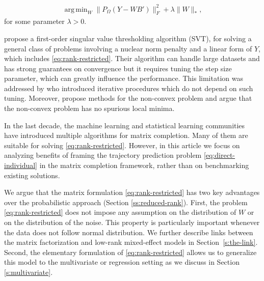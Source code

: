 \documentclass[preprint]{imsart}
\numberwithin{equation}{section}
\theoremstyle{plain}
\DeclareMathOperator*{\argmin}{arg\,min}
\DeclareMathOperator*{\rank}{rank}
\begin{document}

\begin{align}
  \argmin_W \| P_\Omega(Y - WB') \|_F^2 + \lambda\|W\|_*,
\label{eq:rank-restricted}
\end{align}
for some parameter $\lambda > 0$.

\citet{cai2010singular} propose a first-order singular value thresholding algorithm (SVT), for solving a general class of problems involving a nuclear norm penalty and a linear form of $Y$, which includes \eqref{eq:rank-restricted}. Their algorithm can handle large datasets and has strong guarantees on convergence but it requires tuning the step size parameter, which can greatly influence the performance. This limitation was addressed by \citet{ma2011fixed,mazumder2010spectral,hastie2015matrix} who introduced iterative procedures which do not depend on such tuning. Moreover, \citet{hardt2014fast,chen2015fast} propose methods for the non-convex problem and \citet{ge2016matrix} argue that the non-convex problem has no spurious local minima.

In the last decade, the machine learning and statistical learning communities have introduced multiple algorithms for matrix completion. Many of them are suitable for solving \eqref{eq:rank-restricted}. However, in this article we focus on analyzing benefits of framing the trajectory prediction problem \eqref{eq:direct-individual} in the matrix completion framework, rather than on benchmarking existing solutions.

We argue that the matrix formulation \eqref{eq:rank-restricted} has two key advantages over the probabilistic approach (Section \ref{ss:reduced-rank}). First, the problem \eqref{eq:rank-restricted} does not impose any assumption on the distribution of $W$ or on the distribution of the noise. This property is particularly important whenever the data does not follow normal distribution. We further describe links between the matrix factorization and low-rank mixed-effect models in Section~\ref{s:the-link}. Second, the elementary formulation of \eqref{eq:rank-restricted} allows us to generalize this model to the multivariate or regression setting as we discuss in Section \ref{s:multivariate}.  
\end{document}
